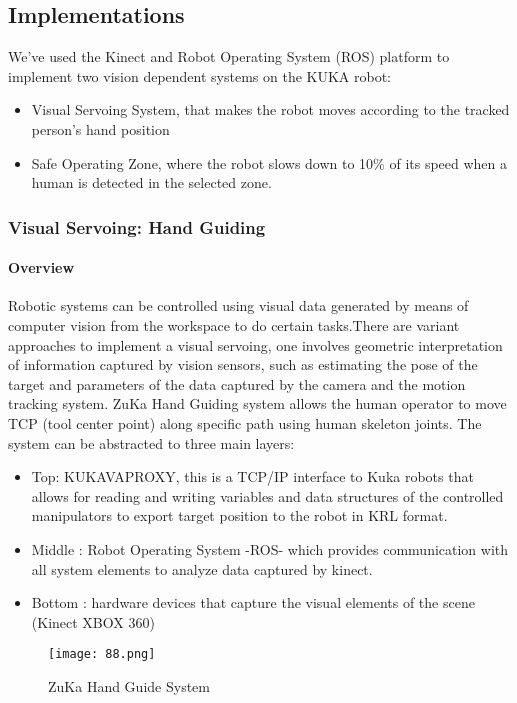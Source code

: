 \subsection{Implementations}
We’ve used the Kinect and Robot Operating System (ROS) platform to implement two vision dependent systems on the KUKA robot:\begin{itemize}
	\item Visual Servoing System, that makes the robot moves according to the tracked person’s hand position
	\item Safe Operating Zone, where the robot slows down to 10\% of its speed when a human is detected in the selected zone.
\end{itemize}



\subsubsection{Visual Servoing: Hand Guiding}
\paragraph {Overview}
Robotic systems can be controlled using visual data generated by means of computer vision from the workspace to do certain tasks.There are variant approaches to implement a visual servoing, one involves geometric interpretation of information captured by vision sensors, such as estimating the pose of the target and parameters of the data captured by the camera and the motion tracking system. 
\newline \vspace{.5cm}
ZuKa Hand Guiding system allows the human operator to move TCP (tool center point) along specific path using human skeleton joints. The system can be abstracted to three main layers:
\begin{itemize}
	\item Top: KUKAVAPROXY, this is a TCP/IP interface to Kuka robots that allows for reading and writing variables and data structures of the controlled manipulators to export target position to the robot in KRL format.
	
	\item  Middle : Robot Operating System -ROS- which provides communication with all system elements to analyze data captured by kinect.
	
	\item Bottom : hardware devices that capture the visual elements of the scene (Kinect XBOX 360)
\end{itemize}
\begin{figure}[H]
	\centering
	\caption{ZuKa Hand Guide System}
	\texttt{[image: 88.png]}
\end{figure} 

